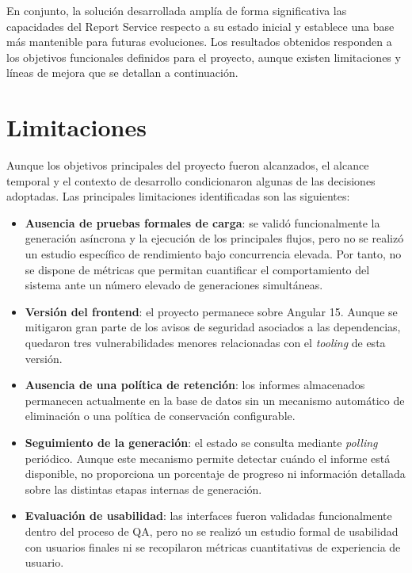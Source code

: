 \documentclass[11pt,a4paper,titlepage,oneside]{report}
\begin{document}
En conjunto, la solución desarrollada amplía de forma significativa las
capacidades del Report Service respecto a su estado inicial y establece una
base más mantenible para futuras evoluciones. Los resultados obtenidos
responden a los objetivos funcionales definidos para el proyecto, aunque
existen limitaciones y líneas de mejora que se detallan a continuación. \\ 

\section{Limitaciones}

Aunque los objetivos principales del proyecto fueron alcanzados, el alcance
temporal y el contexto de desarrollo condicionaron algunas de las decisiones
adoptadas. Las principales limitaciones identificadas son las siguientes:

\begin{itemize}

  \item \textbf{Ausencia de pruebas formales de carga}: se validó
  funcionalmente la generación asíncrona y la ejecución de los principales
  flujos, pero no se realizó un estudio específico de rendimiento bajo
  concurrencia elevada. Por tanto, no se dispone de métricas que permitan
  cuantificar el comportamiento del sistema ante un número elevado de
  generaciones simultáneas.

  \item \textbf{Versión del frontend}: el proyecto permanece sobre Angular 15.
  Aunque se mitigaron gran parte de los avisos de seguridad asociados a las
  dependencias, quedaron tres vulnerabilidades menores relacionadas con el
  \textit{tooling} de esta versión.

  \item \textbf{Ausencia de una política de retención}: los informes
  almacenados permanecen actualmente en la base de datos sin un mecanismo
  automático de eliminación o una política de conservación configurable.

  \item \textbf{Seguimiento de la generación}: el estado se consulta mediante
  \textit{polling} periódico. Aunque este mecanismo permite detectar cuándo el
  informe está disponible, no proporciona un porcentaje de progreso ni
  información detallada sobre las distintas etapas internas de generación.

  \item \textbf{Evaluación de usabilidad}: las interfaces fueron validadas
  funcionalmente dentro del proceso de QA, pero no se realizó un estudio
  formal de usabilidad con usuarios finales ni se recopilaron métricas
  cuantitativas de experiencia de usuario.

\end{itemize}
\end{document}
